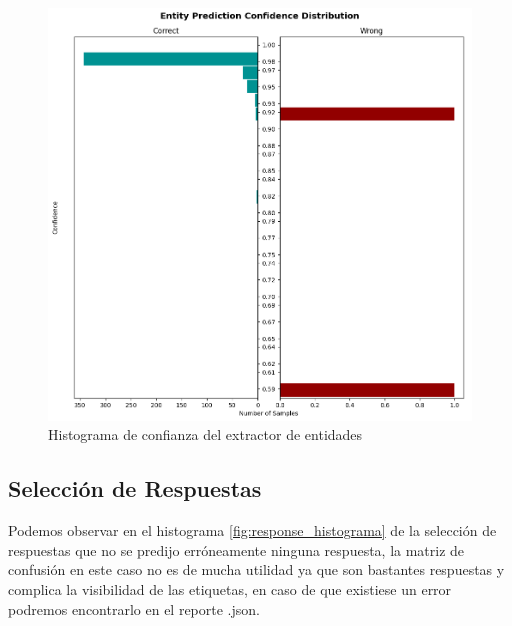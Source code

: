 \begin{figure}[H]
	\centering
	\includegraphics[width=\textwidth]{imagenes/cap5/DIETClassifier_histogram.png}
	\caption{Histograma de confianza del extractor de entidades}
	\label{fig:entity_histograma}
\end{figure}

\subsection{Selección de Respuestas}
Podemos observar en el histograma \ref{fig:response_histograma} de la selección de respuestas que
no se predijo erróneamente ninguna respuesta, la matriz de confusión en este caso no es de mucha
utilidad ya que son bastantes respuestas y complica la visibilidad de las etiquetas, en caso de que
existiese un error podremos encontrarlo en el reporte .json.

